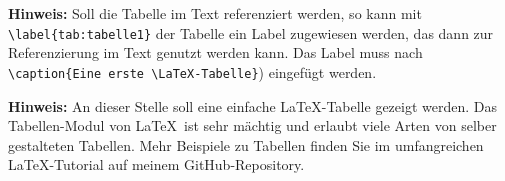 
\textbf{Hinweis:} Soll die Tabelle im Text referenziert werden, so kann mit \texttt{\textbackslash label\{tab:tabelle1\}} der Tabelle ein Label zugewiesen werden, das dann zur Referenzierung im Text genutzt werden kann. Das Label muss nach \texttt{\textbackslash caption\{Eine erste \textbackslash LaTeX-Tabelle\}}) eingefügt werden. 

\textbf{Hinweis:} An dieser Stelle soll eine einfache \LaTeX-Tabelle gezeigt werden. Das Tabellen-Modul von \LaTeX\ ist sehr mächtig und erlaubt viele Arten von selber gestalteten Tabellen. Mehr Beispiele zu Tabellen finden Sie im umfangreichen \LaTeX-Tutorial auf meinem GitHub-Repository.

